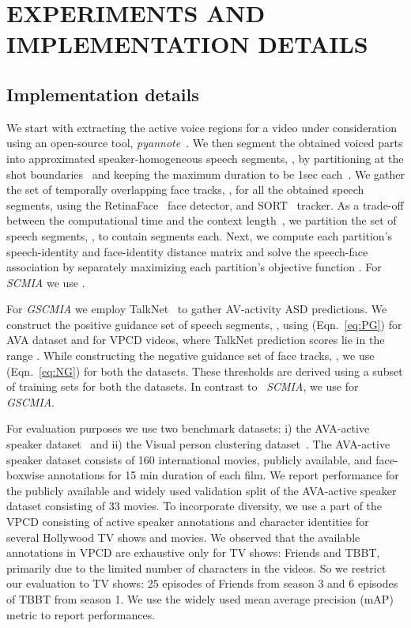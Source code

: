 \section{EXPERIMENTS AND IMPLEMENTATION DETAILS}
\subsection{Implementation details}
We start with extracting the active voice regions for a video under consideration using an open-source tool, \emph{pyannote}~\cite{pyannote}. We then segment the obtained voiced parts into approximated speaker-homogeneous speech segments, , by partitioning at the shot boundaries~\cite{pardo2021moviecuts} and keeping the maximum duration to be 1sec each~\cite{sharma2022unsupervised}. We gather the set of temporally overlapping face tracks, , for all the obtained speech segments, using the RetinaFace~\cite{deng2020retinaface} face detector, and SORT~\cite{Bewley2016_sort} tracker. As a trade-off between the computational time and the context length~\cite{sharma2022unsupervised}, we partition the set of speech segments, , to contain  segments each. Next, we compute each partition's speech-identity and face-identity distance matrix and solve the speech-face association by separately maximizing each partition's objective function . For \emph{SCMIA} we use . 

For \emph{GSCMIA} we employ TalkNet~\cite{tao2021someone} to gather AV-activity ASD predictions. We construct the positive guidance set of speech segments, , using  (Eqn.~\ref{eq:PG}) for AVA dataset and  for VPCD videos, where TalkNet prediction scores lie in the range . While constructing the negative guidance set of face tracks, , we use  (Eqn.~\ref{eq:NG}) for both the datasets. These thresholds are derived using a subset of training sets for both the datasets. In contrast to ~\emph{SCMIA}, we use  for \emph{GSCMIA}.

For evaluation purposes we use two benchmark datasets: i) the AVA-active speaker dataset~\cite{roth2020ava} and ii) the Visual person clustering dataset~\cite{brown2021face}. The AVA-active speaker dataset consists of 160 international movies, publicly available, and face-boxwise annotations for 15 min duration of each film. We report performance for the publicly available and widely used validation split of the AVA-active speaker dataset consisting of 33 movies. To incorporate diversity, we use a part of the VPCD consisting of active speaker annotations and character identities for several Hollywood TV shows and movies. We observed that the available annotations in VPCD are exhaustive only for TV shows: Friends and TBBT, primarily due to the limited number of characters in the videos. So we restrict our evaluation to TV shows: 25 episodes of Friends from season 3 and 6 episodes of TBBT from season 1. We use the widely used mean average precision (mAP) metric to report performances.

